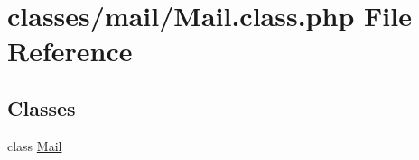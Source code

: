 \hypertarget{Mail_8class_8php}{\section{classes/mail/\-Mail.class.\-php File Reference}
\label{Mail_8class_8php}
}
\subsection*{Classes}
\begin{DoxyCompactItemize}
\item 
class \hyperlink{classMail}{Mail}
\end{DoxyCompactItemize}
